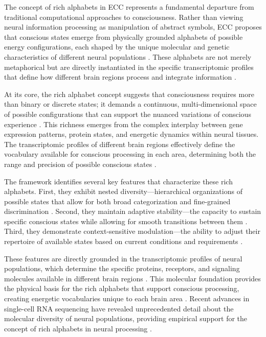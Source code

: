 \begin{refsection}
The concept of rich alphabets in ECC represents a fundamental departure from traditional computational approaches to consciousness. Rather than viewing neural information processing as manipulation of abstract symbols, ECC proposes that conscious states emerge from physically grounded alphabets of possible energy configurations, each shaped by the unique molecular and genetic characteristics of different neural populations \cite{bakken2021comparative}. These alphabets are not merely metaphorical but are directly instantiated in the specific transcriptomic profiles that define how different brain regions process and integrate information \cite{hawrylycz2016inferring}.

At its core, the rich alphabet concept suggests that consciousness requires more than binary or discrete states; it demands a continuous, multi-dimensional space of possible configurations that can support the nuanced variations of conscious experience \cite{cembrowski2018continuous}. This richness emerges from the complex interplay between gene expression patterns, protein states, and energetic dynamics within neural tissues. The transcriptomic profiles of different brain regions effectively define the vocabulary available for conscious processing in each area, determining both the range and precision of possible conscious states \cite{lake2016neuronal}.

The framework identifies several key features that characterize these rich alphabets. First, they exhibit nested diversity—hierarchical organizations of possible states that allow for both broad categorization and fine-grained discrimination \cite{nowakowski2017spatiotemporal}. Second, they maintain adaptive stability—the capacity to sustain specific conscious states while allowing for smooth transitions between them \cite{raj2008nature}. Third, they demonstrate context-sensitive modulation—the ability to adjust their repertoire of available states based on current conditions and requirements \cite{lein2017promise}.

These features are directly grounded in the transcriptomic profiles of neural populations, which determine the specific proteins, receptors, and signaling molecules available in different brain regions \cite{saunders2018molecular}. This molecular foundation provides the physical basis for the rich alphabets that support conscious processing, creating energetic vocabularies unique to each brain area \cite{yuste2020community}. Recent advances in single-cell RNA sequencing have revealed unprecedented detail about the molecular diversity of neural populations, providing empirical support for the concept of rich alphabets in neural processing \cite{macosko2015highly, zeisel2015cell}.


\end{refsection}
